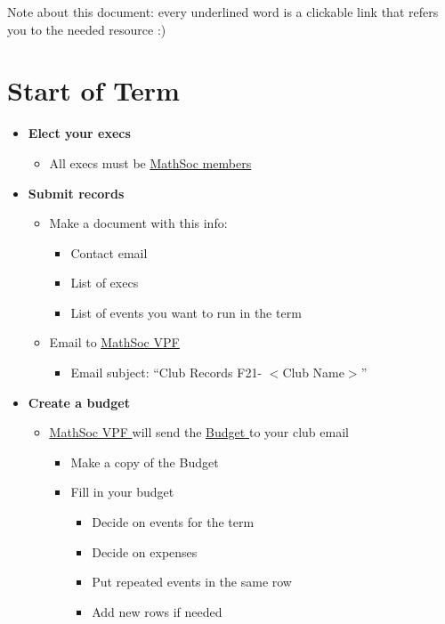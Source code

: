 \documentclass[utf8]{article}
\makeatletter
\newcommand{\termandyear}{F21}
\newcommand{\MathSocVPF}{\href{mailto:vpf@mathsoc.uwaterloo.ca}{\underline{MathSoc VPF} }}
\newcommand{\budget}{\href{https://drive.google.com/file/d/1uQIh7Qp33NX0TgJhl3DdY-r2HqZzQKuZ/view}{\underline{Budget} }}
\newcommand{\membership}{\hyperref[sec:membership]{\underline{MathSoc members}}}
\makeatother
\begin{document}
\maketitle
Note about this document: every underlined word is a clickable link that refers you to the needed resource :)
\section*{Start of Term}
\begin{itemize}
    \item \textbf{Elect your execs}
    \begin{itemize}
        \item All execs must be \membership
    \end{itemize}
    \item \textbf{Submit records}
    \begin{itemize}
        \item Make a document with this info:
        \begin{itemize}
            \item Contact email
            \item List of execs
            \item List of events you want to run in the term
        \end{itemize}
        \item Email to \MathSocVPF 
        \begin{itemize}
            \item Email subject: ``Club Records \termandyear - $<$Club Name$>$''
        \end{itemize}
    \end{itemize}
    \item \textbf{Create a budget}
    \begin{itemize}
        \item \MathSocVPF will send the \budget to your club email
        \begin{itemize}
            \item Make a copy of the Budget
            \item Fill in your budget
            \begin{itemize}
                \item Decide on events for the term
                \item Decide on expenses
                \item Put repeated events in the same row
                \item Add new rows if needed

\end{itemize}
\end{itemize}
\end{itemize}
\end{itemize}
\end{document}
